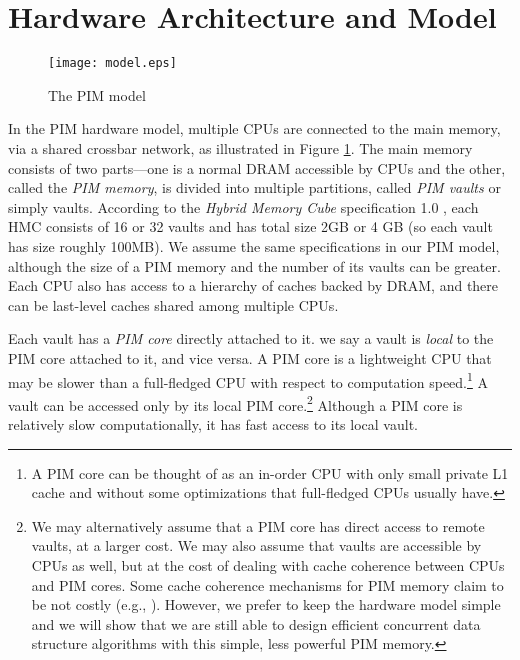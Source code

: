 \section{Hardware Architecture and Model}


\label{section:hardware_model}

\begin{figure}[ht!]
\centering
\texttt{[image: model.eps]}
\caption{The PIM model}
\label{figure:model}
\end{figure}

In the PIM hardware model, multiple CPUs are connected to the main
memory, via a shared crossbar network, as illustrated in Figure \ref{figure:model}.
The main memory consists of two parts---one is a normal DRAM accessible by CPUs 
and the other, called the \textit{PIM memory}, is divided into multiple partitions, 
called \textit{PIM vaults} or simply vaults.  
According to the \textit{Hybrid Memory Cube} specification 1.0 \cite{website:HMC}, 
each HMC consists of 16 or 
32 vaults and has total size 2GB or 4 GB (so each vault has size roughly 100MB). 
We assume the same specifications in our PIM model, although the size of a PIM memory and 
the number of its vaults can be greater. 
Each CPU also has access to a hierarchy of caches backed by DRAM,
and there can be last-level caches shared among multiple CPUs. 

Each vault has a \textit{PIM core} directly attached to it.
we say a vault is \textit{local} to the PIM core attached to it, and vice versa.
A PIM core is a lightweight CPU that may be slower than a full-fledged CPU
with respect to computation speed.\footnote{
A PIM core can be thought of as an in-order CPU with only small private L1 cache and 
without some optimizations that full-fledged CPUs usually have.}
A vault can be accessed only by its local PIM core.\footnote{
We may alternatively assume that a PIM core has direct access to remote vaults, at a larger cost. 
We may also assume that vaults are accessible by CPUs as well, 
but at the cost of dealing with cache coherence between CPUs and PIM cores. 
Some cache coherence mechanisms for PIM memory claim to be not costly 
(e.g., \cite{boroumand2016, Ahn2015:1}). 
However, we prefer to keep the hardware model simple and we will show that we are still able to 
design efficient concurrent data structure algorithms with this simple, less powerful PIM memory.}
Although a PIM core is relatively slow computationally, it has fast access to its local vault.

